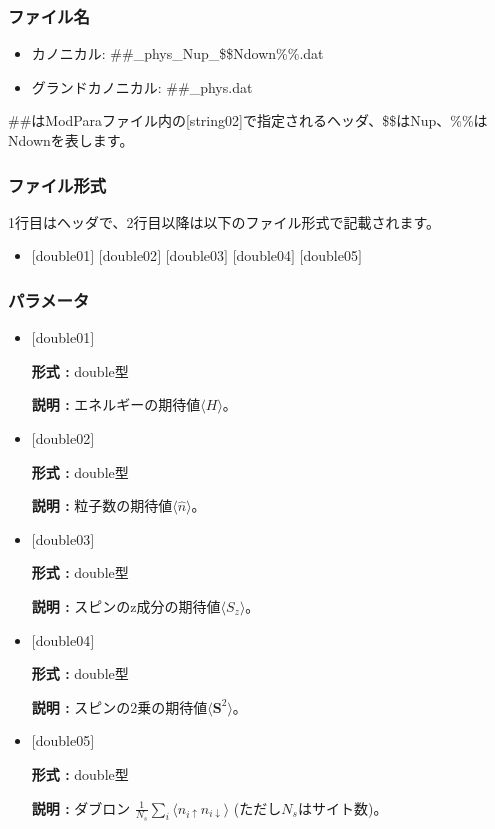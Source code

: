 \subsubsection{ファイル名}
\begin{itemize}
   \item {カノニカル:} \#\#\_phys\_Nup\_\$\$Ndown\%\%.dat
   \item {グランドカノニカル:} \#\#\_phys.dat
 \end{itemize}
  \#\#はModParaファイル内の[string02]で指定されるヘッダ、\$\$はNup、\%\%はNdownを表します。

\subsubsection{ファイル形式}
1行目はヘッダで、2行目以降は以下のファイル形式で記載されます。
 \begin{itemize}
   \item $[$double01$]$ $[$double02$]$ $[$double03$]$ $[$double04$]$ $[$double05$]$
  \end{itemize}
\subsubsection{パラメータ}
 \begin{itemize}

  \item  $[$double01$]$
  
 {\bf 形式 :} double型

{\bf 説明 :} エネルギーの期待値$\langle H\rangle$。
 
  \item $[$double02$]$

 {\bf 形式 :} double型 

{\bf 説明 :}  粒子数の期待値$\langle \hat{n}\rangle$。

  \item $[$double03$]$

 {\bf 形式 :} double型 

{\bf 説明 :}  スピンのz成分の期待値$\langle S_z\rangle$。

  \item $[$double04$]$

 {\bf 形式 :} double型 

{\bf 説明 :}  スピンの2乗の期待値$\langle {\bm S}^2\rangle$。

  \item $[$double05$]$

 {\bf 形式 :} double型 

{\bf 説明 :}  ダブロン
$\frac{1}{N_s} \sum_{i}\langle n_{i\uparrow}n_{i\downarrow}\rangle$ (ただし$N_s$はサイト数)。


 \end{itemize}

